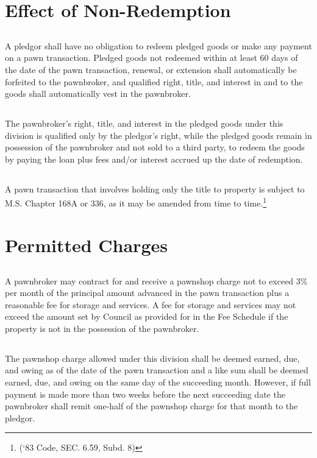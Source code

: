 \section{Effect of Non-Redemption}
\subsection{}
A pledgor shall have no obligation to redeem pledged goods or make any payment on a pawn transaction.  Pledged goods not redeemed within at least 60 days of the date of the pawn transaction, renewal, or extension shall automatically be forfeited to the pawnbroker, and qualified right, title, and interest in and to the goods shall automatically vest in the pawnbroker.
\subsection{}
The pawnbroker’s right, title, and interest in the pledged goods under this division is qualified only by the pledgor’s right, while the pledged goods remain in possession of the pawnbroker and not sold to a third party, to redeem the goods by paying the loan plus fees and/or interest accrued up the date of redemption.
\subsection{}
A pawn transaction that involves holding only the title to property is subject to M.S. Chapter 168A or 336, as it may be amended from time to time.\footnote{(‘83 Code, SEC. 6.59, Subd. 8)}

\section{Permitted Charges}
\subsection{}
A pawnbroker may contract for and receive a pawnshop charge not to exceed 3\% per month of the principal amount advanced in the pawn transaction plus a reasonable fee for storage and services.  A fee for storage and services may not exceed the amount set by Council as provided for in the Fee Schedule if the property is not in the possession of the pawnbroker.
\subsection{}
The pawnshop charge allowed under this division shall be deemed earned, due, and owing as of the date of the pawn transaction and a like sum shall be deemed earned, due, and owing on the same day of the succeeding month.  However, if full payment is made more than two weeks before the next succeeding date the pawnbroker shall remit one-half of the pawnshop charge for that month to the pledgor.
